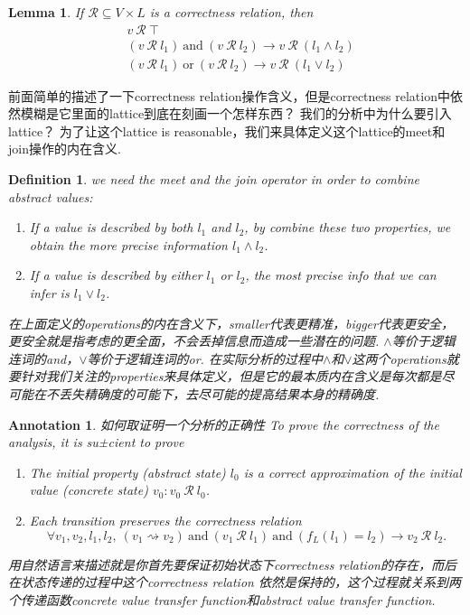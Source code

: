 \documentclass{article}
\newtheorem{lemma}[theorem]{Lemma}
\newtheorem{definition}[theorem]{Definition}
\newtheorem{annotation}[theorem]{Annotation}
\begin{document}
\begin{lemma}
\rm If $\mathcal{R} \subseteq V \times L$ is a correctness relation, then
$$
\begin{aligned}
& v~\mathcal{R}~\top \\
& (v~\mathcal{R}~l_1)~\text{and}~(v~\mathcal{R}~l_2) \rightarrow v~\mathcal{R}~(l_1 \wedge l_2) \\
& (v~\mathcal{R}~l_1)~\text{or}~(v~\mathcal{R}~l_2) \rightarrow v~\mathcal{R}~(l_1 \vee l_2)
\end{aligned}
$$
\end{lemma}

前面简单的描述了一下correctness relation操作含义，但是correctness relation中依然模糊是它里面的lattice到底在刻画一个怎样东西？ 我们的分析中为什么要引入lattice？ 为了让这个lattice is reasonable，我们来具体定义这个lattice的meet和join操作的内在含义.

\begin{definition}
\rm we need the meet and the join operator in order to combine abstract values: 
\begin{enumerate}
	\item If a value is described by both $l_1$ and $l_2$, by combine these two properties, we obtain the more precise information $l_1 \wedge l_2$.
	\item If a value is described by either $l_1$ or $l_2$, the most precise info that we can infer is $l_1 \vee l_2$. 
\end{enumerate}

{\color{blue}在上面定义的operations的内在含义下，smaller代表更精准，bigger代表更安全，更安全就是指考虑的更全面，不会丢掉信息而造成一些潜在的问题. $\wedge$等价于逻辑连词的and，$\vee$等价于逻辑连词的or. 在实际分析的过程中$\wedge$和$\vee$这两个operations就要针对我们关注的properties来具体定义，但是它的最本质内在含义是每次都是尽可能在不丢失精确度的可能下，去尽可能的提高结果本身的精确度}.
\end{definition}


\newpage
\begin{annotation}
\rm {\color{red} 如何取证明一个分析的正确性} To prove the correctness of the analysis, it is su±cient to prove 
\begin{enumerate}
	\item The initial property (abstract state) $l_0$ is a correct approximation of the initial value (concrete state) $v_0: v_0~\mathcal{R}~ l_0$.
	\item Each transition preserves the correctness relation
	$$
	\forall v_1,v_2,l_1,l_2,~(v_1 \rightsquigarrow v_2)~\text{and}~(v_1 ~\mathcal{R}~l_1)~\text{and}~(f_L(l_1) = l_2) \rightarrow v_2~\mathcal{R}~ l_2.
	$$
\end{enumerate}
{\color{blue} 用自然语言来描述就是你首先要保证初始状态下correctness relation的存在，而后在状态传递的过程中这个correctness relation 依然是保持的，这个过程就关系到两个传递函数concrete value transfer function和abstract value transfer function}.
\end{annotation}
\end{document}
